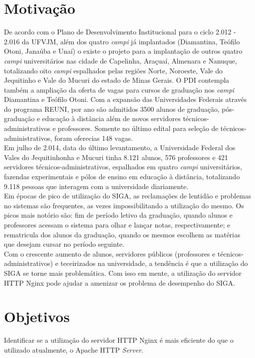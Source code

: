 \section{Motivação}
De acordo com o Plano de Desenvolvimento Institucional para o ciclo 2.012 - 
2.016 da UFVJM, além dos quatro \textit{campi} já implantados (Diamantina, 
Teófilo Otoni, Janaúba e Unaí) o existe o projeto para a implantação de outros 
quatro \textit{campi} universitários nas cidade de Capelinha, Araçuaí, Almenara 
e Nanuque, totalizando oito \textit{campi} espalhados pelas regiões Norte, 
Noroeste, Vale do Jequitinho e Vale do Mucuri do estado de Minas Gerais. O PDI 
contempla também a ampliação da oferta de vagas para cursos de graduação nos 
\textit{campi} Diamantina e Teófilo Otoni.
Com a expansão das Universidades Federais através do programa REUNI, por ano 
são admitidos 3500 alunos de graduação, pós-graduação e educação à distância 
além de novos servidores técnicos-administrativos e professores. Somente no 
último edital para seleção de técnicos-administrativos, foram oferecias 148 
vagas.\\
Em julho de 2.014, data do último levantamento, a Universidade Federal dos 
Vales do Jequitinhonha e Mucuri tinha 8.121 alunos, 576 professores e 421 
servidores técnicos-administrativos, espalhados em quatro \textit{campi} 
universitários, fazendas experimentais e pólos de ensino em educação à 
distância, totalizando 9.118 pessoas que interagem com a universidade 
diariamente.\\
Em épocas de pico de utilização do SIGA, as reclamações de lentidão e problemas 
no sistemas são frequentes, as vezes impossibilitando a utilização do mesmo. Os 
picos mais notório são: fim de período letivo da graduação, quando alunos e 
professores acessam o sistema para olhar e lançar notas, respectivamente; e 
rematricula dos alunos da graduação, quando os mesmos escolhem as matérias que 
desejam cursar no período seguinte.\\
Com o crescente aumento de alunos, servidores públicos (professores e técnicos-administrativos) e teceirizados na universidade, a tendência é que a utilização do SIGA se torne mais problemática.
Com isso em mente, a utilização do servidor HTTP Nginx pode ajudar a amenizar 
os problema de desempenho do SIGA.\\
\section{Objetivos}
Identificar se a utilização do servidor HTTP Nginx é mais eficiente do que o 
utilizado atualmente, o Apache HTTP \textit{Server}.\\
